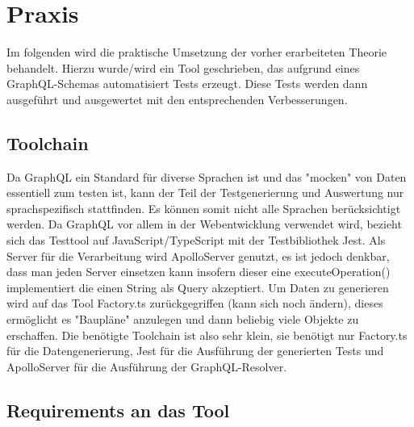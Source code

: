 \chapter{Praxis}

Im folgenden wird die praktische Umsetzung der vorher erarbeiteten Theorie behandelt.
Hierzu wurde/wird ein Tool geschrieben, das aufgrund eines GraphQL-Schemas automatisiert Tests erzeugt.
Diese Tests werden dann ausgeführt und ausgewertet mit den entsprechenden Verbesserungen.

\section{Toolchain}

Da GraphQL ein Standard für diverse Sprachen ist und das "mocken" von Daten essentiell zum testen ist, kann
der Teil der Testgenerierung und Auswertung nur sprachspezifisch stattfinden. Es können somit nicht alle
Sprachen berücksichtigt werden.
Da GraphQL vor allem in der Webentwicklung verwendet wird, bezieht sich das Testtool auf JavaScript/TypeScript
mit der Testbibliothek Jest.
Als Server für die Verarbeitung wird ApolloServer genutzt, es ist jedoch denkbar,
dass man jeden Server einsetzen kann insofern dieser eine executeOperation() implementiert die einen
String als Query akzeptiert.
Um Daten zu generieren wird auf das Tool Factory.ts zurückgegriffen (kann sich noch ändern), dieses
ermöglicht es "Baupläne" anzulegen und dann beliebig viele Objekte zu erschaffen.
Die benötigte Toolchain ist also sehr klein, sie benötigt nur Factory.ts für die Datengenerierung,
Jest für die Ausführung der generierten Tests und
ApolloServer für die Ausführung der GraphQL-Resolver.

\section{Requirements an das Tool}

